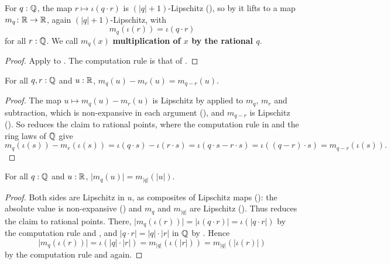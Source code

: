 \begin{definition}
  \label{scale}
  For $q : \mathbb{Q}$, the map $r \mapsto \iota(q \cdot r)$ is $(\lvert q \rvert + 1)$-Lipschitz (), so by  it lifts to a map $m_q \colon \mathbb{R} \to \mathbb{R}$, again $(\lvert q \rvert + 1)$-Lipschitz, with
  \[
    m_q(\iota(r)) = \iota(q \cdot r)
  \]
  for all $r : \mathbb{Q}$. We call $m_q(x)$ \textbf{multiplication of $x$ by the rational $q$}.
\end{definition}
\begin{proof}
  Apply  to . The computation rule is that of .
\end{proof}

\begin{lemma}
  \label{scaleDistLSub}
  For all $q, r : \mathbb{Q}$ and $u : \mathbb{R}$, $m_q(u) - m_r(u) = m_{q - r}(u)$.
\end{lemma}
\begin{proof}
  The map $u \mapsto m_q(u) - m_r(u)$ is Lipschitz by  applied to $m_q$, $m_r$ and subtraction, which is non-expansive in each argument (), and $m_{q-r}$ is Lipschitz (). So  reduces the claim to rational points, where the computation rule in  and the ring laws of $\mathbb{Q}$ give
  \[
    m_q(\iota(s)) - m_r(\iota(s)) = \iota(q \cdot s) - \iota(r \cdot s) = \iota(q \cdot s - r \cdot s) = \iota((q - r) \cdot s) = m_{q-r}(\iota(s)).
  \]
\end{proof}

\begin{lemma}
  \label{absScale}
  For all $q : \mathbb{Q}$ and $u : \mathbb{R}$, $\lvert m_q(u) \rvert = m_{\lvert q \rvert}(\lvert u \rvert)$.
\end{lemma}
\begin{proof}
  Both sides are Lipschitz in $u$, as composites of Lipschitz maps (): the absolute value is non-expansive () and $m_q$ and $m_{\lvert q \rvert}$ are Lipschitz (). Thus  reduces the claim to rational points. There, $\lvert m_q(\iota(r)) \rvert = \lvert \iota(q \cdot r) \rvert = \iota(\lvert q \cdot r \rvert)$ by the computation rule and , and $\lvert q \cdot r \rvert = \lvert q \rvert \cdot \lvert r \rvert$ in $\mathbb{Q}$ by . Hence
  \[
    \lvert m_q(\iota(r)) \rvert = \iota(\lvert q \rvert \cdot \lvert r \rvert) = m_{\lvert q \rvert}(\iota(\lvert r \rvert)) = m_{\lvert q \rvert}(\lvert \iota(r) \rvert)
  \]
  by the computation rule and  again.
\end{proof}

